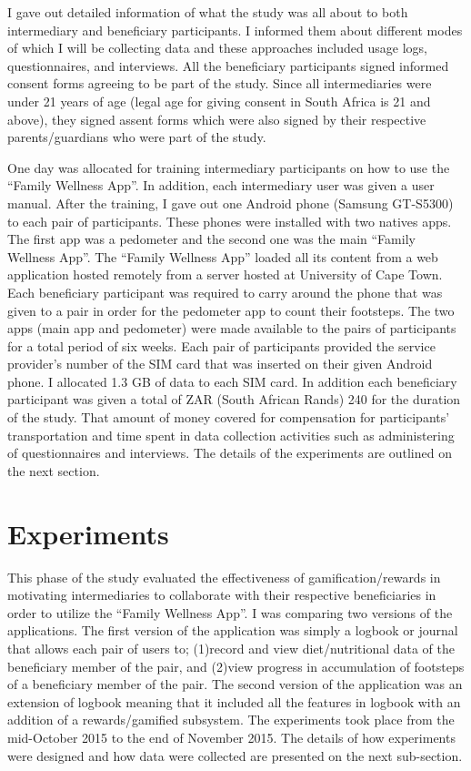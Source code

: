I gave out detailed information of what the study was all about to both intermediary and beneficiary participants. I informed them about different modes of which I will be collecting data and these approaches included usage logs, questionnaires, and interviews. All the beneficiary participants signed informed consent forms agreeing to be part of the study. Since all intermediaries were under 21 years of age (legal age for giving consent in South Africa is 21 and above), they signed assent forms which were also signed by their respective parents/guardians who were part of the study.

One day was allocated for training intermediary participants on how to use the ``Family Wellness App''. In addition, each intermediary user was given a user manual. After the training, I gave out one Android phone (Samsung GT-S5300) to each pair of participants. These phones were installed with two natives apps. The first app was a pedometer and the second one was the main ``Family Wellness App''. The ``Family Wellness App'' loaded all its content from a web application hosted remotely from a server hosted at University of Cape Town. Each beneficiary participant was required to carry around the phone that was given to a pair in order for the pedometer app to count their footsteps. The two apps (main app and pedometer) were made available to the pairs of participants for a total period of six weeks. Each pair of participants provided the service provider's number of the SIM card that was inserted on their given Android phone. I allocated 1.3 GB of data to each SIM card. In addition each beneficiary participant was given a total of ZAR (South African Rands) 240 for the duration of the study. That amount of money covered for compensation for participants' transportation and time spent in data collection activities such as administering of questionnaires and interviews. The details of the experiments are outlined on the next section. 
\section{Experiments}
This phase of the study evaluated the effectiveness of gamification/rewards in motivating  intermediaries to collaborate with their respective beneficiaries in order to utilize the ``Family Wellness App''. I was comparing two versions of the applications. The first version of the application was simply a logbook or journal that allows each pair of users to; (1)record and view diet/nutritional data of the beneficiary member of the pair, and (2)view progress in accumulation of footsteps of a beneficiary member of the pair. The second version of the application was an extension of logbook meaning that it included all the features in logbook  with an addition of a rewards/gamified subsystem. The experiments took place from the mid-October 2015 to the end of November 2015.  The details of how experiments were designed and how data were collected are presented on the next sub-section.
